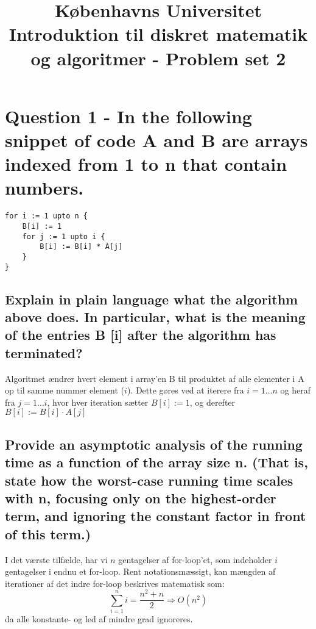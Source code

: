 \documentclass[a4paper,12pt]{article}
\begin{document}
% 

\title{Københavns Universitet\\
Introduktion til diskret matematik og algoritmer - Problem set 2}
\maketitle %

\section[Question 1]{Question 1 - In the following snippet of code A and B are arrays indexed from 1 to n that contain numbers. }

\begin{lstlisting}
for i := 1 upto n { 
    B[i] := 1 
    for j := 1 upto i {
        B[i] := B[i] * A[j] 
    }
} 
\end{lstlisting}

\subsection[]{Explain in plain language what the algorithm above does. In particular, what is the meaning of the entries B [i] after the algorithm has terminated? }

Algoritmet ændrer hvert element i array'en B til produktet af alle elementer i A op til samme nummer element ($i$). Dette gøres ved at iterere fra $i=1\dots n$ og heraf fra $j=1\dots  i$, hvor hver iteration sætter $B[i] := 1$, og derefter $B[i] := B[i] \cdot A[j]$

\subsection[]{Provide an asymptotic analysis of the running time as a function of the array size n. (That is, state how the worst-case running time scales with n, focusing only on the highest-order term, and ignoring the constant factor in front of this term.)}

I det værste tilfælde, har vi $n$ gentagelser af for-loop'et, som indeholder $i$ gentagelser i endnu et for-loop. 
Rent notationsmæssigt, kan mængden af iterationer af det indre for-loop beskrives matematisk som:\\
\[\sum_{i=1}^{n}i=\dfrac{n^2+n}{2} \Rightarrow O(n^2)\]
da alle konstante- og led af mindre grad ignoreres.
\end{document}
